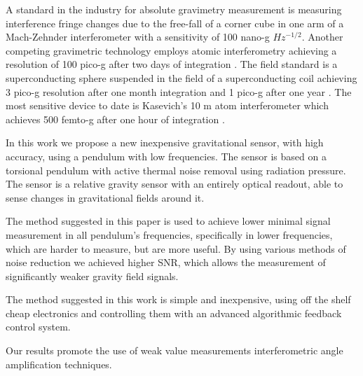 \documentclass[\main/master.tex]{subfiles}
\begin{document}
\fi
\par\noindent
A standard in the industry for absolute gravimetry measurement is measuring interference fringe changes due to the free-fall of a corner cube in one arm of a Mach-Zehnder interferometer with a sensitivity of 100 nano-g $Hz^{-1/2}$. Another competing gravimetric technology employs atomic interferometry achieving a resolution of 100 pico-g after two days of integration \cite{Peters01}. 
The field standard is a superconducting sphere suspended in the field of a superconducting coil achieving 3 pico-g resolution after one month integration and 1 pico-g  after one year \cite{Goodkind99}. 
The most sensitive device to date is Kasevich's 10 m atom interferometer which achieves 500 femto-g after one hour of integration \cite{PhysRevA.91.033629,kasevich2014prospects}. 
\par\noindent
In this work we propose a new inexpensive gravitational sensor, with high accuracy, using a pendulum with low frequencies. The sensor is based on a torsional pendulum with active thermal noise removal using radiation pressure. The sensor is a relative gravity sensor with an entirely optical readout, able to sense changes in gravitational fields around it. 
\iffalse
\fi
\par\noindent
The method suggested in this paper is used to achieve lower minimal signal measurement in all pendulum's frequencies, specifically in lower frequencies, which are harder to measure, but are more useful. By using various methods of noise reduction we achieved higher SNR, which allows the measurement of significantly weaker gravity field signals.
\par\noindent
The method suggested in this work is simple and inexpensive, using off the shelf cheap electronics and controlling them with an advanced algorithmic feedback control system.
\par\noindent
Our results promote the use of weak value measurements interferometric angle amplification techniques. 
\end{document}
